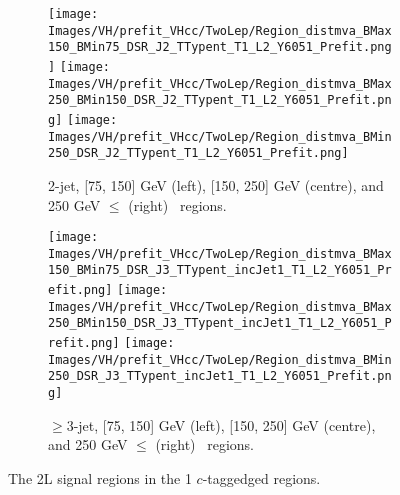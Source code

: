 \begin{figure}[h!]
    \centering
    \begin{subfigure}[b]{\textwidth}
        \centering
        \texttt{[image: Images/VH/prefit\_VHcc/TwoLep/Region\_distmva\_BMax150\_BMin75\_DSR\_J2\_TTypent\_T1\_L2\_Y6051\_Prefit.png]}
        \texttt{[image: Images/VH/prefit\_VHcc/TwoLep/Region\_distmva\_BMax250\_BMin150\_DSR\_J2\_TTypent\_T1\_L2\_Y6051\_Prefit.png]}
        \texttt{[image: Images/VH/prefit\_VHcc/TwoLep/Region\_distmva\_BMin250\_DSR\_J2\_TTypent\_T1\_L2\_Y6051\_Prefit.png]}
        \caption{2-jet, [75, 150] GeV (left), [150, 250] GeV (centre), and 250  GeV $\leq$ (right) \ptv\ regions.}
        \label{fig:plots_VHcc_2L_SR_1c_2J}
    \end{subfigure}
    \begin{subfigure}[b]{\textwidth}
        \centering
        \texttt{[image: Images/VH/prefit\_VHcc/TwoLep/Region\_distmva\_BMax150\_BMin75\_DSR\_J3\_TTypent\_incJet1\_T1\_L2\_Y6051\_Prefit.png]}
        \texttt{[image: Images/VH/prefit\_VHcc/TwoLep/Region\_distmva\_BMax250\_BMin150\_DSR\_J3\_TTypent\_incJet1\_T1\_L2\_Y6051\_Prefit.png]}
        \texttt{[image: Images/VH/prefit\_VHcc/TwoLep/Region\_distmva\_BMin250\_DSR\_J3\_TTypent\_incJet1\_T1\_L2\_Y6051\_Prefit.png]}
        \caption{$\geq$3-jet, [75, 150] GeV (left), [150, 250] GeV (centre), and 250  GeV $\leq$ (right) \ptv\ regions.}
        \label{fig:plots_VHcc_2L_SR_1c_3J}
    \end{subfigure}
    \caption{The 2L signal regions in the 1 $c$-taggedged regions.}
    \label{fig:plots_VHcc_2L_SR_1c}
\end{figure}

\newpage
\vspace*{\fill} 


